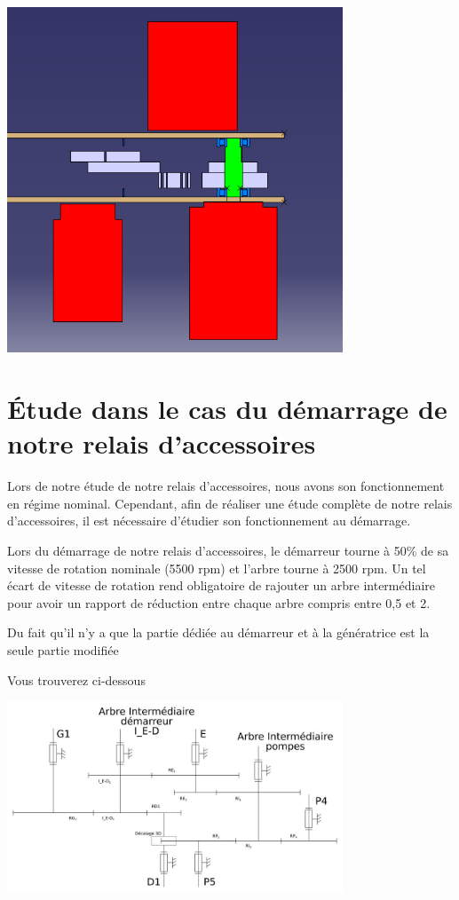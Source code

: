 \documentclass{config}
\begin{document}
\begin{spacing}{1.2}
\begin{center}
\includegraphics[width=0.75\textwidth]{BE_3D_complet_ARO_coupe.PNG}
\end{center}


\newpage
\section{Étude dans le cas du démarrage de notre relais d'accessoires}

Lors de notre étude de notre relais d'accessoires, nous avons son fonctionnement en régime nominal. Cependant, afin de réaliser une étude complète de notre relais d'accessoires, il est nécessaire d'étudier son fonctionnement au démarrage.

Lors du démarrage de notre relais d'accessoires, le démarreur tourne à 50\% de sa vitesse de rotation nominale (5500 rpm) et l'arbre tourne à 2500 rpm. Un tel écart de vitesse de rotation rend obligatoire de rajouter un arbre intermédiaire pour avoir un rapport de réduction entre chaque arbre compris entre 0,5 et 2.

Du fait qu'il n'y a que la partie dédiée au démarreur et à la génératrice est la seule partie modifiée


Vous trouverez ci-dessous 
\begin{center}
\includegraphics[width=0.75\textwidth]{schema_V2.jpg}
\end{center}



\end{spacing}
\end{document}
